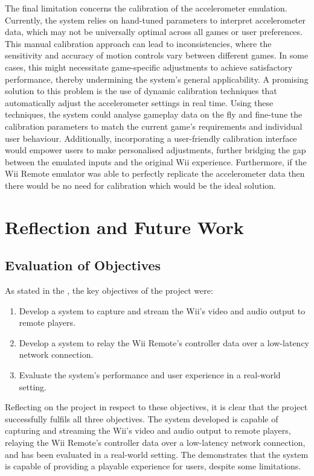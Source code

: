 The final limitation concerns the calibration of the accelerometer emulation.
Currently, the system relies on hand-tuned parameters to interpret accelerometer
data, which may not be universally optimal across all games or user preferences.
This manual calibration approach can lead to inconsistencies, where the
sensitivity and accuracy of motion controls vary between different games. In
some cases, this might necessitate game-specific adjustments to achieve
satisfactory performance, thereby undermining the system’s general
applicability. A promising solution to this problem is the use of dynamic
calibration techniques that automatically adjust the accelerometer settings in
real time. Using these techniques, the system could analyse gameplay data on the
fly and fine-tune the calibration parameters to match the current game’s
requirements and individual user behaviour. Additionally, incorporating a
user-friendly calibration interface would empower users to make personalised
adjustments, further bridging the gap between the emulated inputs and the
original Wii experience. Furthermore, if the Wii Remote emulator was able to
perfectly replicate the accelerometer data then there would be no need for
calibration which would be the ideal solution.

\section{Reflection and Future Work}

\subsection{Evaluation of Objectives}
As stated in the , the key objectives of the project were:

\begin{enumerate}
	\item  Develop a system to capture and stream the Wii’s video and audio output to remote players.
	\item Develop a system to relay the Wii Remote’s controller data over a low-latency network connection.
	\item Evaluate the system’s performance and user experience in a real-world setting.
\end{enumerate}

Reflecting on the project in respect to these objectives, it is clear that the
project successfully fulfils all three objectives. The system developed is
capable of capturing and streaming the Wii’s video and audio output to remote
players, relaying the Wii Remote’s controller data over a low-latency network
connection, and has been evaluated in a real-world setting. The
 demonstrates that the system is capable of
providing a playable experience for users, despite some limitations.

